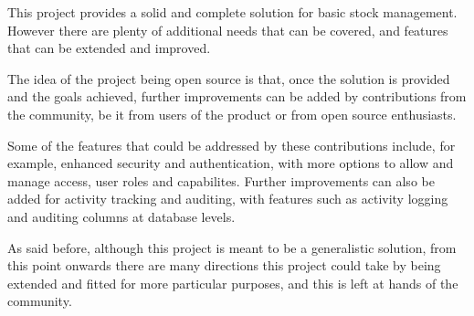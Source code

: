 This project provides a solid and complete solution for basic stock management. However there are plenty of additional needs that can be covered, and features that can be extended and improved.

The idea of the project being open source is that, once the solution is provided and the goals achieved, further improvements can be added by contributions from the community, be it from users of the product or from open source enthusiasts.

Some of the features that could be addressed by these contributions include, for example, enhanced security and authentication, with more options to allow and manage access, user roles and capabilites. Further improvements can also be added for activity tracking and auditing, with features such as activity logging and auditing columns at database levels.

As said before, although this project is meant to be a generalistic solution, from this point onwards there are many directions this project could take by being extended and fitted for more particular purposes, and this is left at hands of the community.
